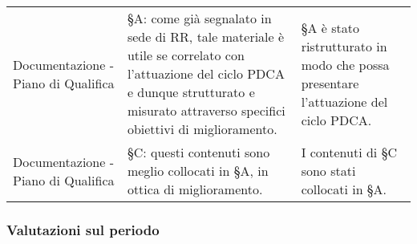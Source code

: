 \begin{longtable}{ 
				>{\centering}p{} 
				>{\centering}p{}
				>{\centering\arraybackslash}p{}}
					\\
				
				Documentazione - Piano di Qualifica
					&
				§A: come già segnalato in sede di RR, tale materiale è utile se correlato con l’attuazione del ciclo PDCA e dunque strutturato e misurato attraverso specifici obiettivi di miglioramento. 
					&
				§A è stato ristrutturato in modo che possa presentare l'attuazione del ciclo PDCA.
					\\
					
				Documentazione - Piano di Qualifica
					&
				§C: questi contenuti sono meglio collocati in §A, in ottica di miglioramento. 
					&
				I contenuti di §C sono stati collocati in §A.
					\\
			\end{longtable}
			
		\subsubsection{Valutazioni sul periodo}

